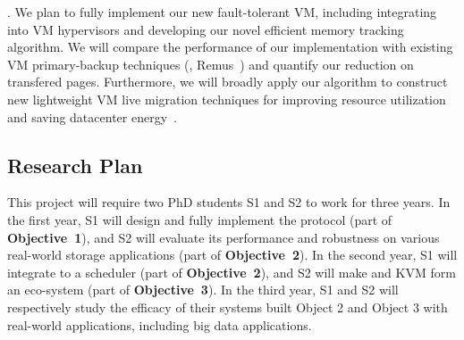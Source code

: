 
. We plan to fully implement our new fault-tolerant VM, 
including integrating \falcon into VM hypervisors and developing our novel 
efficient memory tracking algorithm. We will compare the performance of our 
implementation with existing VM primary-backup techniques 
(\eg, Remus~\cite{remus:nsdi08}) and quantify our reduction on transfered 
pages. Furthermore, we will broadly apply our algorithm to construct new 
lightweight VM live migration techniques for improving resource utilization and 
saving datacenter energy~\cite{vmotion:atc05}.


% 

\vspace{-.15in}\subsection{Research Plan} \label{sec:plan}\vspace{-.075in}

This project will require two PhD students S1 and S2 to work for 
three years. In the first year, S1 will design and fully implement the \falcon 
protocol (part of \textbf{Objective~1}), and S2 will evaluate its performance 
and robustness on various real-world storage applications (part of 
\textbf{Objective~2}). In the second year, S1 will 
integrate \falcon to a scheduler \mesos (part of \textbf{Objective~2}), and S2 
will make \falcon and KVM form an eco-system (part of \textbf{Objective~3}). In 
the third year, S1 and S2 will respectively study the efficacy of their systems 
built Object 2 and Object 3 with real-world applications, including big data 
applications.


